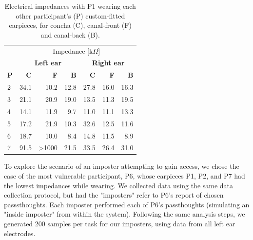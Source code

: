\documentclass{sigchi}
\begin{document}
\begin{table}[h]
\begin{center}
\begin{tabular}{lrrrrrr}
& \multicolumn{6}{c}{Impedance [k\(\Omega\)]} \\
\cline{2-7}
& \multicolumn{3}{|c|}{\textbf{Left ear}} & \multicolumn{3}{c|}{\textbf{Right ear}} \\
\textbf{P} & \textbf{C} & \textbf{F} & \textbf{B} & \textbf{C} & \textbf{F} & \textbf{B} \\
\hline
2 & 34.1 & 10.2 & 12.8 & 27.8 & 16.0 & 16.3\\
3 & 21.1 & 20.9 & 19.0 & 13.5 & 11.3 & 19.5\\
4 & 14.1 & 11.9 & 9.7 & 11.0 & 11.1 & 13.3\\
5 & 17.2 & 21.9 & 10.3 & 32.6 & 12.5 & 11.6\\
6 & 18.7 & 10.0 & 8.4 & 14.8 & 11.5 & 8.9\\
7 & 91.5 & \textgreater1000 & 21.5 & 33.5 & 26.4 & 31.0\\
\end{tabular}
\end{center}
\caption{Electrical impedances with P1 wearing each other participant's (P) custom-fitted earpieces, for concha (C), canal-front (F) and canal-back (B).}
\label{tab:imposter_impedances}
\end{table}

To explore the scenario of an imposter attempting to gain access, we chose the case of the most vulnerable participant, P6, whose earpieces P1, P2, and P7 had the lowest impedances while wearing. We collected data using the same data collection protocol, but had the "imposters" refer to P6's report of chosen passsthoughts.
Each imposter performed each of P6's passthoughts (simulating an "inside imposter" from within the system). Following the same analysis steps, we generated 200 samples per task for our imposters, using data from all left ear electrodes.

\end{document}
